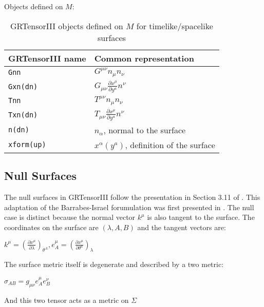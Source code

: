 \documentclass{article}
\begin{document}
Objects defined on $M$:
\begin{table}[h]
  \begin{center}
    \begin{tabular}{ll}\hline\hline
      \textbf{GRTensorIII name} & \textbf{Common representation}\\ \hline
      \texttt{Gnn}        & $G^{\mu \nu} n_\mu n_\nu $  \\
      \texttt{Gxn(dn)}        & $G_{\mu \nu} \frac{\partial x^\mu}{\partial y^a} n^\nu $  \\
      \texttt{Tnn}        & $T^{\mu \nu} n_\mu n_\nu $  \\
      \texttt{Txn(dn)}        & $T_{\mu \nu} \frac{\partial x^\mu}{\partial y^a} n^\nu $  \\
      \texttt{n(dn) }      & $n_\alpha$, normal to the surface   \\    
      \texttt{xform(up)}        & $x^\alpha(y^a)$, definition of the surface  \\    
    \end{tabular}
    \caption{GRTensorIII objects defined on $M$ for timelike/spacelike surfaces}
    \label{tab:ts2}
  \end{center}
\end{table}

\FloatBarrier
\subsection{Null Surfaces}
The null surfaces in GRTensorIII follow the presentation in Section 3.11 of \cite{poisson:2004}. This adaptation of the 
Barrabes-Israel forumulation \cite{barrabesisrael:1991} was first presented in \cite{poisson:2002}. The null case is distinct because the 
normal vector $k^\mu$ is also tangent to the surface. The coordinates on the surface are $(\lambda, A, B)$ and the 
tangent vectors are:
\begin{center}
$k^\mu = \left( \frac{\partial x^\mu}{\partial \lambda} \right)_{\theta^A}, 
e^\mu_A = \left( \frac{\partial x^\mu}{\partial \theta^a} \right)_{\lambda}$
\end{center}

The surface metric itself is degenerate and described by a two metric:
\begin{center}
$\sigma_{AB} = g_{\mu \nu} e^\mu_A e^\nu_B$
\end{center}
And this two tensor acts as a metric on $\Sigma$
\end{document}
